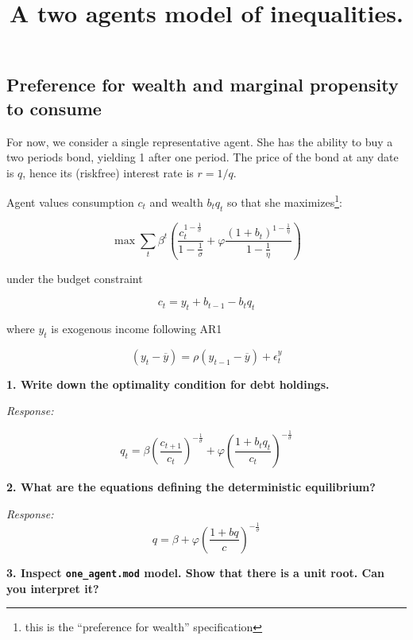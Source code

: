 \documentclass[
  letterpaper,
  DIV=11,
  numbers=noendperiod]{scrartcl}
\title{A two agents model of inequalities.}
\author{}
\date{}
\begin{document}
\maketitle
\ifdefined\Shaded\renewenvironment{Shaded}{\begin{tcolorbox}[enhanced, borderline west={3pt}{0pt}{shadecolor}, breakable, frame hidden, sharp corners, boxrule=0pt, interior hidden]}{\end{tcolorbox}}\fi

\hypertarget{preference-for-wealth-and-marginal-propensity-to-consume}{%
\subsection{Preference for wealth and marginal propensity to
consume}\label{preference-for-wealth-and-marginal-propensity-to-consume}}

For now, we consider a single representative agent. She has the ability
to buy a two periods bond, yielding 1 after one period. The price of the
bond at any date is \(q\), hence its (riskfree) interest rate is
\(r=1/q\).

Agent values consumption \(c_t\) and wealth \(b_t q_t\) so that she
maximizes\footnote{this is the ``preference for wealth'' specification}:

\[\max \sum_t \beta^t \left( \frac{c_t^{1-\frac{1}{\sigma}}}{1-\frac{1}{\sigma}}+ \varphi \frac{ (1+b_t)^{1-\frac{1}{\eta}} } {1-\frac{1}{\eta}} \right)\]

under the budget constraint

\[c_t = y_t + b_{t-1} - b_t q_t\]

where \(y_t\) is exogenous income following AR1

\[(y_t-\overline{y})=\rho (y_{t-1}-\overline{y}) + \epsilon^y_t\]

\textbf{1. Write down the optimality condition for debt holdings.}

\emph{Response:}

\[q_t = \beta \left(\frac{c_{t+1}}{c_{t}}\right)^{-\frac{1}{\sigma}}+\varphi \left(\frac{1 + b_t q_t}{c_{t}}\right)^{-\frac{1}{\sigma}}\]

\textbf{2. What are the equations defining the deterministic
equilibrium?}

\emph{Response:}
\[q = \beta + \varphi \left(\frac{1 + b q}{c}\right)^{-\frac{1}{\sigma}}\]

\textbf{3. Inspect \texttt{one\_agent.mod} model. Show that there is a
unit root. Can you interpret it?}
\end{document}
